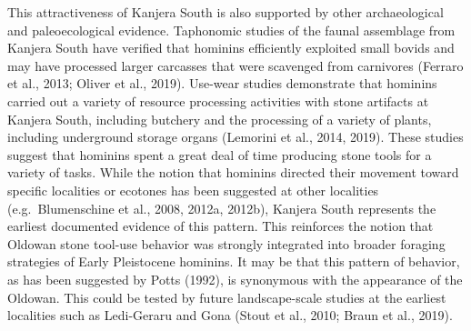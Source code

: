 \documentclass[]{elsarticle} %
\begin{document}
This attractiveness of Kanjera South is also supported by other
archaeological and paleoecological evidence. Taphonomic studies of the
faunal assemblage from Kanjera South have verified that hominins
efficiently exploited small bovids and may have processed larger
carcasses that were scavenged from carnivores (\hspace{0pt}Ferraro et
al., 2013\hspace{0pt}; \hspace{0pt}Oliver et al., 2019\hspace{0pt}).
Use-wear studies demonstrate that hominins carried out a variety of
resource processing activities with stone artifacts at Kanjera South,
including butchery and the processing of a variety of plants, including
underground storage organs (\hspace{0pt}Lemorini et al.,
2014\hspace{0pt}, \hspace{0pt}2019\hspace{0pt}). These studies suggest
that hominins spent a great deal of time producing stone tools for a
variety of tasks. While the notion that hominins directed their movement
toward specific localities or ecotones has been suggested at other
localities (e.g.~\hspace{0pt}Blumenschine et al., 2008\hspace{0pt},
\hspace{0pt}2012a\hspace{0pt}, \hspace{0pt}2012b\hspace{0pt}), Kanjera
South represents the earliest documented evidence of this pattern. This
reinforces the notion that Oldowan stone tool-use behavior was strongly
integrated into broader foraging strategies of Early Pleistocene
hominins. It may be that this pattern of behavior, as has been suggested
by Potts (1992), is synonymous with the appearance of the Oldowan. This
could be tested by future landscape-scale studies at the earliest
localities such as Ledi-Geraru and Gona (\hspace{0pt}Stout et al.,
2010\hspace{0pt}; \hspace{0pt}Braun et al., 2019\hspace{0pt}).
\end{document}
